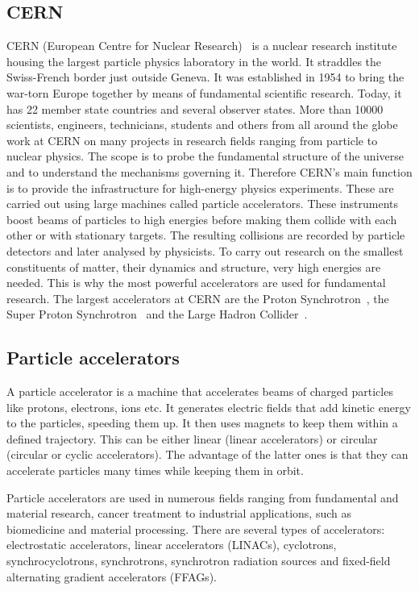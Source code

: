 \documentclass[twoside,12pt]{packages/mytustyle}  %
\begin{document}
\subsection{CERN}
CERN (European Centre for Nuclear Research)~\cite{CERN:00000} is a nuclear research institute housing the largest particle physics laboratory in the world. It straddles the Swiss-French border just outside Geneva. It was established in 1954 to bring the war-torn Europe together by means of fundamental scientific research. Today, it has 22 member state countries and several observer states. More than 10000 scientists, engineers, technicians, students and others from all around the globe work at CERN on many projects in research fields ranging from particle to nuclear physics. The scope is to probe the fundamental structure of the universe and to understand the mechanisms governing it. Therefore CERN's main function is to provide the infrastructure for high-energy physics experiments. These are carried out using large machines called particle accelerators. These instruments boost beams of particles to high energies before making them collide with each other or with stationary targets. The resulting collisions are recorded by particle detectors and later analysed by physicists. To carry out research on the smallest constituents of matter, their dynamics and structure, very high energies are needed. This is why the most powerful accelerators are used for fundamental research. The largest accelerators at CERN are the Proton Synchrotron~\cite{}, the Super Proton Synchrotron~\cite{Mills:133232} and the Large Hadron Collider~\cite{}.

\subsection{Particle accelerators}
A particle accelerator is a machine that accelerates beams of charged particles like protons, electrons, ions etc. It generates electric fields that add kinetic energy to the particles, speeding them up. It then uses magnets to keep them within a defined trajectory. This can be either linear (linear accelerators) or circular (circular or cyclic accelerators). The advantage of the latter ones is that they can accelerate particles many times while keeping them in orbit.

Particle accelerators are used in numerous fields ranging from fundamental and material research, cancer treatment to industrial applications, such as biomedicine and material processing. There are several types of accelerators: electrostatic accelerators, linear accelerators (LINACs), cyclotrons, synchrocyclotrons, synchrotrons, synchrotron radiation sources and fixed-field alternating gradient accelerators (FFAGs).
\end{document}
